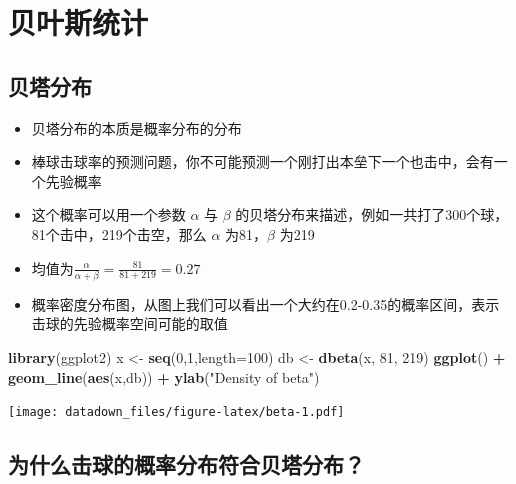 \documentclass[
]{book}
\newenvironment{Shaded}{\begin{snugshade}}{\end{snugshade}}
\newcommand{\DataTypeTok}[1]{\textcolor[rgb]{0.13,0.29,0.53}{#1}}
\newcommand{\DecValTok}[1]{\textcolor[rgb]{0.00,0.00,0.81}{#1}}
\newcommand{\KeywordTok}[1]{\textcolor[rgb]{0.13,0.29,0.53}{\textbf{#1}}}
\newcommand{\NormalTok}[1]{#1}
\newcommand{\OperatorTok}[1]{\textcolor[rgb]{0.81,0.36,0.00}{\textbf{#1}}}
\newcommand{\StringTok}[1]{\textcolor[rgb]{0.31,0.60,0.02}{#1}}
\begin{document}
\hypertarget{bayes}{%
\chapter{贝叶斯统计}\label{bayes}}

\hypertarget{ux8d1dux5854ux5206ux5e03}{%
\section{贝塔分布}\label{ux8d1dux5854ux5206ux5e03}}

\begin{itemize}
\item
  贝塔分布的本质是概率分布的分布
\item
  棒球击球率的预测问题，你不可能预测一个刚打出本垒下一个也击中，会有一个先验概率
\item
  这个概率可以用一个参数 \(\alpha\) 与 \(\beta\) 的贝塔分布来描述，例如一共打了300个球，81个击中，219个击空，那么 \(\alpha\) 为81，\(\beta\) 为219
\item
  均值为\(\frac{\alpha}{\alpha + \beta} = \frac{81}{81+219} = 0.27\)
\item
  概率密度分布图，从图上我们可以看出一个大约在0.2-0.35的概率区间，表示击球的先验概率空间可能的取值
\end{itemize}

\begin{Shaded}
\begin{Highlighting}[]
\KeywordTok{library}\NormalTok{(ggplot2)}
\NormalTok{x <-}\StringTok{ }\KeywordTok{seq}\NormalTok{(}\DecValTok{0}\NormalTok{,}\DecValTok{1}\NormalTok{,}\DataTypeTok{length=}\DecValTok{100}\NormalTok{)}
\NormalTok{db <-}\StringTok{ }\KeywordTok{dbeta}\NormalTok{(x, }\DecValTok{81}\NormalTok{, }\DecValTok{219}\NormalTok{)}
\KeywordTok{ggplot}\NormalTok{() }\OperatorTok{+}\StringTok{ }\KeywordTok{geom_line}\NormalTok{(}\KeywordTok{aes}\NormalTok{(x,db)) }\OperatorTok{+}\StringTok{ }\KeywordTok{ylab}\NormalTok{(}\StringTok{"Density of beta"}\NormalTok{)}
\end{Highlighting}
\end{Shaded}

\texttt{[image: datadown\_files/figure-latex/beta-1.pdf]}

\hypertarget{ux4e3aux4ec0ux4e48ux51fbux7403ux7684ux6982ux7387ux5206ux5e03ux7b26ux5408ux8d1dux5854ux5206ux5e03}{%
\section{为什么击球的概率分布符合贝塔分布？}\label{ux4e3aux4ec0ux4e48ux51fbux7403ux7684ux6982ux7387ux5206ux5e03ux7b26ux5408ux8d1dux5854ux5206ux5e03}}
\end{document}
